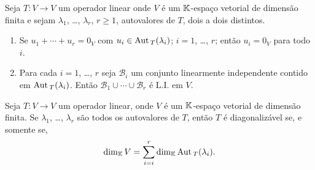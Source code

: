 \documentclass{beamer}
\begin{document}
    \begin{frame}
        \begin{teorema}
            Seja $T : V \to V$ um operador linear onde $V$ é um $\mathbb{K}$-espaço vetorial de dimensão finita e sejam $\lambda_1$, \dots, $\lambda_r$, $r \ge 1$, autovalores de $T$, dois a dois distintos.
            \begin{enumerate}[label={\roman*})]
                \item\label{autovetorLI} Se $u_1 + \cdots + u_r = 0_V$ com $u_i \in {\rm Aut\,}_T(\lambda_i)$; $i = 1$, \dots, $r$; então $u_i = 0_V$ para todo $i$.
                \item Para cada $i = 1$, \dots, $r$ seja $\mathcal{B}_i$ um conjunto linearmente independente contido em ${\rm Aut\,}_T(\lambda_i)$. Então $\mathcal{B}_1 \cup \cdots \cup \mathcal{B}_r$ é L.I. em $V$.
            \end{enumerate}
        \end{teorema}
    \end{frame}

    \begin{frame}
        \begin{corolario}
            Seja $T : V \to V$ um operador linear, onde $V$ é um $\mathbb{K}$-espaço vetorial de dimensão finita. Se $\lambda_1$, \dots, $\lambda_r$ são todos os autovalores de $T$, então $T$ é diagonalizável se, e somente se,
            \[
                \dim_{\mathbb{K}} V = \sum_{i = i}^r\dim_{\mathbb{K}}{\rm Aut\,}_T(\lambda_i).
            \]
        \end{corolario}
    \end{frame}
\end{document}
